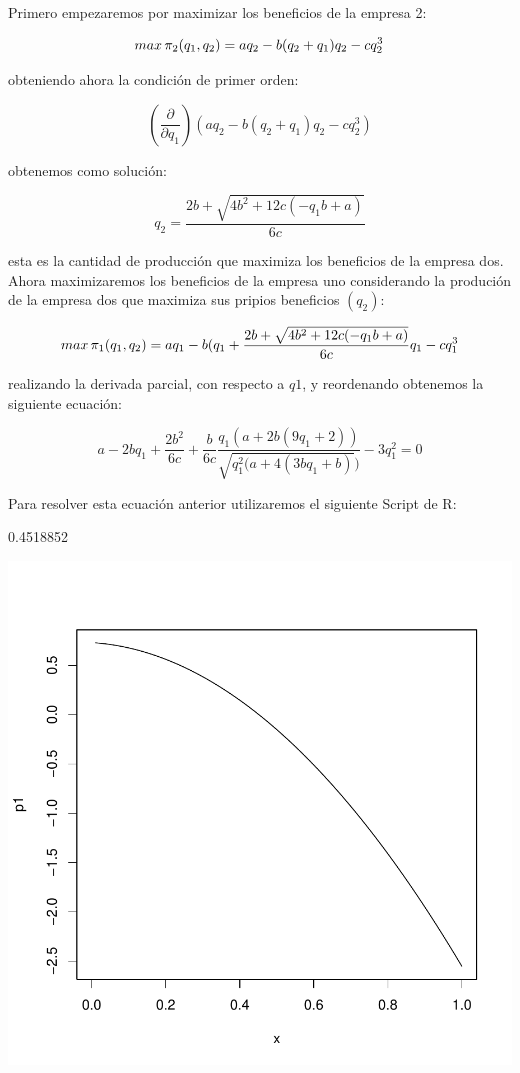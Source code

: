 \documentclass{article}
\begin{document}
\vspace{5mm}

Primero empezaremos por maximizar los beneficios de la empresa 2:

$$max\thinspace \pi_2(q_1,q_2)=aq_2-b(q_2+q_1)q_2-cq^3_2$$

obteniendo ahora la condici\'on de primer orden:

$$(\frac{\partial}{\partial q_1})(aq_2-b(q_2+q_1)q_2-cq^3_2)$$

obtenemos como soluci\'on:

$$q_2=\frac{2b+\sqrt{4b^2+12c(-q_1b+a)}}{6c}$$

esta es la cantidad de producci\'on que maximiza los beneficios de la empresa dos. Ahora maximizaremos los beneficios de la empresa uno considerando la produci\'on de la empresa dos que maximiza sus pripios beneficios $(q_2)$:

$$max\thinspace \pi_1(q_1,q_2)=aq_1-b(q_1+\frac{2b+\sqrt{4b^2+12c(-q_1b+a)}}{6c}q_1-cq^3_1$$

realizando la derivada parcial, con respecto a $q1$, y reordenando obtenemos la siguiente ecuación:

$$a-2bq_1+\frac{2b^2}{6c}+\frac{b}{6c}\frac{q_1(a+2b(9q_1+2))}{\sqrt{q_1^2(a+4(3bq_1+b)})}-3q_1^2=0$$

Para resolver esta ecuaci\'on anterior utilizaremos el siguiente Script de R:
\begin{Schunk}
\begin{Soutput}
[1] 0.4518852
\end{Soutput}
\end{Schunk}
\includegraphics{PUTAPRUEBA-003}
\end{document}
